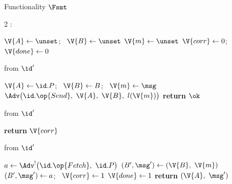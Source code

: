 \begin{interface}[nofloat]{Functionality $\Fsmt$ \\
}

{\scriptsize
\setlength{\columnsep}{1.4em}
\begin{multicols}{2}
:
\begin{algorithmic}[1]
\setcounter{contline}{0}\algcont
\State $\V{A} \gets \unset$; \ $\V{B} \gets \unset$
\State $\V{m} \gets \unset$
\State $\V{corr} \gets 0$; \ $\V{done} \gets 0$
\algsave
\end{algorithmic}
\vspace{1.4ex}

 \quad from $\id'$
\begin{algorithmic}[1]
\algcont
{} \label{ln:smtonce}
\State $\V{A} \gets \id.P$; \ $\V{B} \gets B$; \ $\V{m} \gets \msg$
\State $\Adv\bigl(\id.\op{Send},\ \V{A},\ \V{B},\ l(\V{m})\bigr)$ \label{ln:smtleak}
\State \textbf{return} $\ok$
\algsave
\end{algorithmic}
\vspace{1.4ex}

 \quad from $\id'$
\begin{algorithmic}[1]
\algcont
{}
\State \textbf{return} $\V{corr}$ \label{ln:smtreport}
\algsave
\end{algorithmic}
\vspace{1.4ex}

\columnbreak

 \quad from $\id'$
\begin{algorithmic}[1]
\algcont
{}
\State $a \gets \Adv^{!}\bigl(\id.\op{Fetch},\ \id.P\bigr)$ \label{ln:smtdeliver}
\State $(B', \msg') \gets (\V{B},\ \V{m})$ \label{ln:smthonest}
  \State $(B', \msg') \gets a$; \ $\V{corr} \gets 1$ \label{ln:smtsub}
\EndIf
{} \label{ln:smtaddr}
\State $\V{done} \gets 1$
\State \textbf{return} $(\V{A},\ \msg')$
\algsave
\end{algorithmic}
\vspace{1.4ex}


\end{multicols}}
\end{interface}
